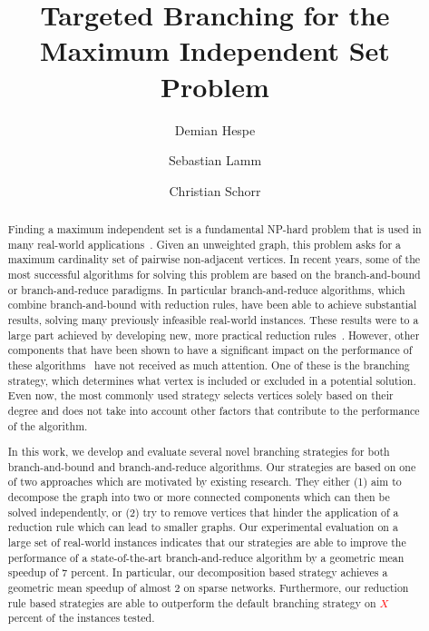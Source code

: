 \documentclass[a4paper,UKenglish,cleveref, autoref, thm-restate]{lipics-v2021}
\title{Targeted Branching for the Maximum Independent Set Problem} %
\author{Demian Hespe}{Karlsruhe Institute of Technology, Institute for
  Theoretical Informatics, Germany}{hespe@kit.edu}{https://orcid.org/0000-0001-6232-2951}{}
\author{Sebastian Lamm}{Karlsruhe Institute of Technology, Institute for
  Theoretical Informatics, Germany}{lamm@kit.edu}{}{\todo{Add funding}}
\author{Christian Schorr}{Karlsruhe Institute of Technology, Institute for
  Theoretical Informatics, Germany}{christian.schorr@student.kit.edu}{}{}
\begin{document}
\maketitle

\begin{abstract}
  Finding a maximum independent set is a fundamental NP-hard problem that is used in many real-world applications~\cite{BIO1,BIO2,RP,NW,CG}.
Given an unweighted graph, this problem asks for a maximum cardinality set of pairwise non-adjacent vertices.
In recent years, some of the most successful algorithms for solving this problem are based on the branch-and-bound or branch-and-reduce paradigms.
In particular branch-and-reduce algorithms, which combine branch-and-bound with reduction rules, have been able to achieve substantial results, solving many previously infeasible real-world instances.
These results were to a large part achieved by developing new, more practical reduction rules~\cite{alsahafy2020computing,ChangKern,dahlum2016accelerating,hespe2019scalable}.
However, other components that have been shown to have a significant impact on the performance of these algorithms~\cite{AkibaIwata} have not received as much attention.
One of these is the branching strategy, which determines what vertex is included or excluded in a potential solution.
Even now, the most commonly used strategy selects vertices solely based on their degree and does not take into account other factors that contribute to the performance of the algorithm.

In this work, we develop and evaluate several novel branching strategies for both branch-and-bound and branch-and-reduce algorithms.
Our strategies are based on one of two approaches which are motivated by existing research. 
They either (1) aim to decompose the graph into two or more connected components which can then be solved independently, or (2) try to remove vertices that hinder the application of a reduction rule which can lead to smaller graphs.
Our experimental evaluation on a large set of real-world instances indicates
that our strategies are able to improve the performance of a state-of-the-art
branch-and-reduce algorithm by a geometric mean speedup of $7$ percent. In particular, our
decomposition based strategy achieves a geometric mean speedup of almost 2 on sparse networks.
Furthermore, our reduction rule based strategies are able to outperform the default branching strategy on \textcolor{red}{$X$} percent of the instances tested.

\end{abstract}
\end{document}
